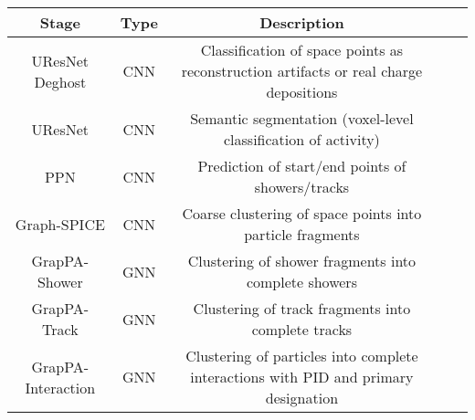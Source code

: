 \begin{tabular}{ccccc}
    \toprule
    Stage & Type & Description \\
    \midrule
    UResNet Deghost & CNN & Classification of space points as reconstruction artifacts or real charge depositions \\
    UResNet & CNN & Semantic segmentation (voxel-level classification of activity) \\
    PPN & CNN & Prediction of start/end points of showers/tracks \\
    Graph-SPICE & CNN & Coarse clustering of space points into particle fragments \\
    GrapPA-Shower & GNN & Clustering of shower fragments into complete showers \\
    GrapPA-Track & GNN & Clustering of track fragments into complete tracks \\
    GrapPA-Interaction & GNN & Clustering of particles into complete interactions with PID and primary designation \\
    \bottomrule
\end{tabular}